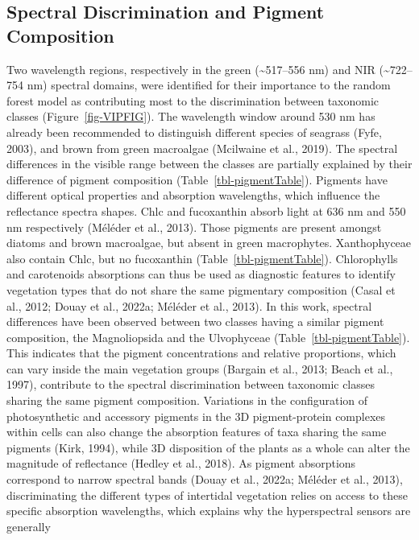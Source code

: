 \documentclass[
  letterpaper,
  11pt,
  english,
  singlespacing,
  headsepline]{MastersDoctoralThesis}
\begin{document}
\begin{spacing}{1.5}
\subsection{Spectral Discrimination and Pigment
Composition}\label{spectral-discrimination-and-pigment-composition}

Two wavelength regions, respectively in the green
(\textasciitilde517--556 nm) and NIR (\textasciitilde722--754 nm)
spectral domains, were identified for their importance to the random
forest model as contributing most to the discrimination between
taxonomic classes (Figure~\ref{fig-VIPFIG}). The wavelength window
around 530 nm has already been recommended to distinguish different
species of seagrass (Fyfe, 2003), and brown from green macroalgae
(Mcilwaine et al., 2019). The spectral differences in the visible range
between the classes are partially explained by their difference of
pigment composition (Table~\ref{tbl-pigmentTable}). Pigments have
different optical properties and absorption wavelengths, which influence
the reflectance spectra shapes. Chlc and fucoxanthin absorb light at 636
nm and 550 nm respectively (Méléder et al., 2013). Those pigments are
present amongst diatoms and brown macroalgae, but absent in green
macrophytes. Xanthophyceae also contain Chlc, but no fucoxanthin
(Table~\ref{tbl-pigmentTable}). Chlorophylls and carotenoids absorptions
can thus be used as diagnostic features to identify vegetation types
that do not share the same pigmentary composition (Casal et al., 2012;
Douay et al., 2022a; Méléder et al., 2013). In this work, spectral
differences have been observed between two classes having a similar
pigment composition, the Magnoliopsida and the Ulvophyceae
(Table~\ref{tbl-pigmentTable}). This indicates that the pigment
concentrations and relative proportions, which can vary inside the main
vegetation groups (Bargain et al., 2013; Beach et al., 1997), contribute
to the spectral discrimination between taxonomic classes sharing the
same pigment composition. Variations in the configuration of
photosynthetic and accessory pigments in the 3D pigment-protein
complexes within cells can also change the absorption features of taxa
sharing the same pigments (Kirk, 1994), while 3D disposition of the
plants as a whole can alter the magnitude of reflectance (Hedley et al.,
2018). As pigment absorptions correspond to narrow spectral bands (Douay
et al., 2022a; Méléder et al., 2013), discriminating the different types
of intertidal vegetation relies on access to these specific absorption
wavelengths, which explains why the hyperspectral sensors are generally

\end{spacing}
\end{document}
